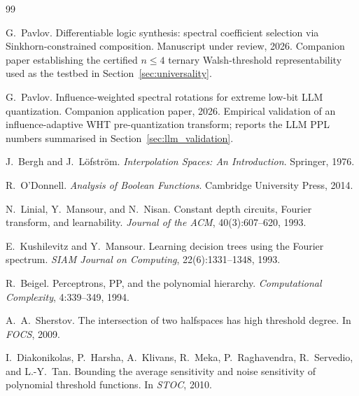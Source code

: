 \documentclass[11pt]{article}
\begin{document}

\begin{thebibliography}{99}

G.~Pavlov.
\newblock Differentiable logic synthesis: spectral coefficient selection via {Sinkhorn}-constrained composition.
\newblock Manuscript under review, 2026. Companion paper establishing the certified $n \le 4$ ternary Walsh-threshold representability used as the testbed in Section~\ref{sec:universality}.

G.~Pavlov.
\newblock Influence-weighted spectral rotations for extreme low-bit {LLM} quantization.
\newblock Companion application paper, 2026. Empirical validation of an influence-adaptive {WHT} pre-quantization transform; reports the {LLM} {PPL} numbers summarised in Section~\ref{sec:llm_validation}.

J.~Bergh and J.~L\"ofstr\"om.
\newblock \emph{Interpolation Spaces: An Introduction}.
\newblock Springer, 1976.

R.~O'Donnell.
\newblock \emph{Analysis of Boolean Functions}.
\newblock Cambridge University Press, 2014.

N.~Linial, Y.~Mansour, and N.~Nisan.
\newblock Constant depth circuits, {Fourier} transform, and learnability.
\newblock \emph{Journal of the ACM}, 40(3):607--620, 1993.

E.~Kushilevitz and Y.~Mansour.
\newblock Learning decision trees using the {Fourier} spectrum.
\newblock \emph{SIAM Journal on Computing}, 22(6):1331--1348, 1993.

R.~Beigel.
\newblock Perceptrons, {PP}, and the polynomial hierarchy.
\newblock \emph{Computational Complexity}, 4:339--349, 1994.

A.~A.~Sherstov.
\newblock The intersection of two halfspaces has high threshold degree.
\newblock In \emph{FOCS}, 2009.

I.~Diakonikolas, P.~Harsha, A.~Klivans, R.~Meka, P.~Raghavendra, R.~Servedio, and L.-Y.~Tan.
\newblock Bounding the average sensitivity and noise sensitivity of polynomial threshold functions.
\newblock In \emph{STOC}, 2010.


\end{thebibliography}
\end{document}
